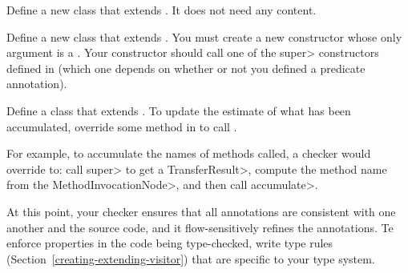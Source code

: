 
Define a new class that extends .
It does not need any content.

Define a new class that extends .
You must create a new constructor whose only argument is a .
Your constructor should call one of the \<super> constructors defined in
 (which one depends on whether or not
you defined a predicate annotation).



Define a class that extends .
To update the estimate of what has been accumulated, override some method in
 to call
.

For example, to accumulate the names of methods called, a checker would override
 to:
call \<super> to get a \<TransferResult>, compute the method name from the \<MethodInvocationNode>,
and then call \<accumulate>.



At this point, your checker ensures that all annotations are consistent
with one another and the source code, and it flow-sensitively refines the
annotations.
Te enforce properties in the code being type-checked, write type rules
(Section~\ref{creating-extending-visitor}) that are specific to your type
system.



